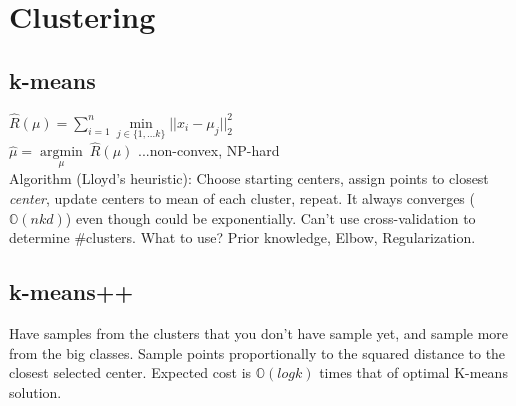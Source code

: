 \section*{Clustering}
\subsection*{k-means}

$\hat{R}(\mu) = \sum_{i=1}^n \underset{j\in\{1,...k\}}{\operatorname{min}}||x_i-\mu_j||_2^2$\\
$\hat{\mu} =  \underset{\mu}{\operatorname{argmin}} ~ \hat{R}(\mu)$ ...non-convex, NP-hard \\
Algorithm (Lloyd's heuristic): Choose starting centers, assign points to closest \emph{center}, update centers to mean of each cluster, repeat. It always converges ($\mathbb{O}(nkd)$) even though could be exponentially.
Can't use cross-validation to determine $\#$clusters. What to use? Prior knowledge, Elbow, Regularization. 

\subsection*{k-means++}
Have samples from the clusters that you don't have sample yet, and sample more from the big classes. Sample points proportionally to the squared distance to the closest selected center. 
Expected cost is $\mathbb{O}(log k)$ times that of optimal K-means solution. 
